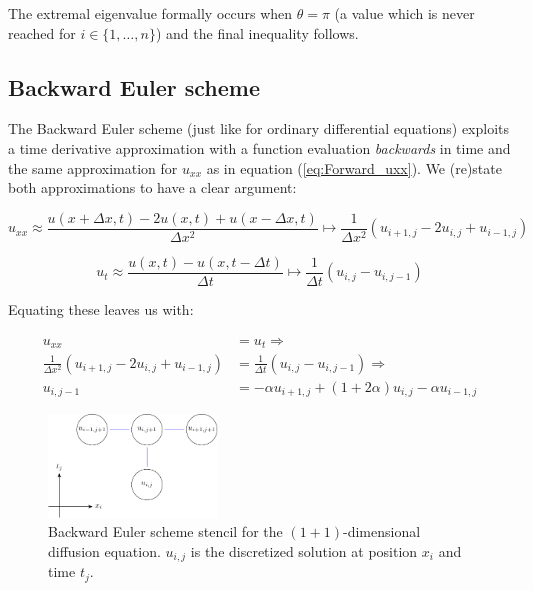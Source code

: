 \documentclass[a4paper, 11pt, notitlepage,english]{article}
\begin{document}
The extremal eigenvalue formally occurs when $\theta = \pi$ (a value which is never reached for $i \in \{1,\dots, n\}$) and the final inequality follows.

\subsection{Backward Euler scheme}
The Backward Euler scheme (just like for ordinary differential equations) exploits a time derivative approximation with a function evaluation \emph{backwards} in time and the same approximation for $u_{xx}$ as in equation (\ref{eq:Forward_uxx}). We (re)state both approximations to have a clear argument:

\begin{equation}
u_{xx} \approx \frac{u(x+\Delta x,t)-2u(x,t)+u(x-\Delta x, t)}{\Delta x^2} \mapsto \frac{1}{\Delta x^2} (u_{i+1,j}-2u_{i,j}+u_{i-1,j})
\label{eq:Backward_uxx}
\end{equation}

\begin{equation}
u_{t} \approx \frac{u(x,t)-u(x,t-\Delta t)}{\Delta t} \mapsto \frac{1}{\Delta t} (u_{i,j}-u_{i,j-1})
\label{eq:Backward_ut}
\end{equation}

Equating these leaves us with:

\begin{align}
u_{xx} &= u_t \Rightarrow \\
 \frac{1}{\Delta x^2} (u_{i+1,j}-2u_{i,j}+u_{i-1,j}) &= \frac{1}{\Delta t} (u_{i,j}-u_{i,j-1}) \Rightarrow \\
 u_{i,j-1} &= -\alpha u_{i+1,j} + (1+2\alpha)u_{i,j} - \alpha u_{i-1,j}
\label{eq:Backward_Euler_scheme}
\end{align}

\begin{figure}[h!tb]
 \centering
 \includegraphics[width=0.4\textwidth]{Grid_BE-figure0}
 \caption{Backward Euler scheme stencil for the $(1+1)$-dimensional diffusion equation. $u_{i,j}$ is the discretized solution at position $x_i$ and time $t_j$.}
 \label{fig:BE_grid}
\end{figure}
\end{document}
